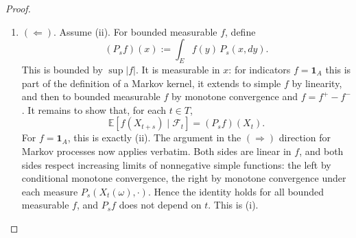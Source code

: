 \begin{proof}
\begin{enumerate}
			We claim that for every $t \in T$ and every Borel $C \subseteq \mathbb{R}$,
			\[
				\nu_{X_t}(C) = \mathbb{P}(\varphi(X_{t+s}) \in C \mid \mathcal{F}_t). \tag{$\ast$}
			\]
			For $C = (-\infty, q]$ with $q \in \mathbb{Q}$, this is Step 1, since $\nu_{X_t}(C) = G(X_t, q)$ on $\{X_t \notin N\}$, which has probability one. For $C = (-\infty, y]$ with $y$ real, take rationals $q_n \downarrow y$; both sides are continuous from above, the right-hand side by conditional dominated convergence. Thus $(\ast)$ holds on the $\pi$-system of half-lines. The class of $C$ satisfying $(\ast)$ is a $\lambda$-system, by linearity for proper differences and conditional monotone convergence for increasing unions. By the $\pi$--$\lambda$ theorem, $(\ast)$ holds for all Borel $C$.

			\textit{Step 4 (pulling back to $E$).} Applying $(\ast)$ with $C = B$ gives $\nu_{X_t}(B) = 1$ almost surely for every $t$. Hence $N' := N \cup \{x : \nu_x(B) < 1\} \in \mathcal{E}$ satisfies $\mu_t(N') = 0$ for all $t \in T$. Define
			\[
				P_s(x, A) := \begin{cases} \nu_x(\varphi(A)) & x \notin N', \\ \delta_{x_0}(A) & x \in N', \end{cases} \qquad A \in \mathcal{E}.
			\]
			Here $\varphi(A)$ is Borel because $\varphi$ is a Borel isomorphism. For $x \notin N'$, $P_s(x, \cdot)$ is the pushforward of $\nu_x|_B$ under $\varphi^{-1}$, hence a probability measure, and $x \mapsto P_s(x, A)$ is measurable by Step 3. So $P_s$ is a Markov kernel. Finally, by $(\ast)$ with $C = \varphi(A)$, for every $t \in T$,
			\[
				P_s(X_t, A) = \nu_{X_t}(\varphi(A)) = \mathbb{P}(\varphi(X_{t+s}) \in \varphi(A) \mid \mathcal{F}_t) = \mathbb{P}(X_{t+s} \in A \mid \mathcal{F}_t),
			\]
			where the first equality uses $\mu_t(N') = 0$. Since $s \in T$ was arbitrary, this is (ii).
		  \item $(\Leftarrow)$. Assume (ii). For bounded measurable $f$, define
			\[
				(P_s f)(x) := \int_E f(y) \, P_s(x, dy).
			\]
			This is bounded by $\sup |f|$. It is measurable in $x$: for indicators $f = \mathbf{1}_A$ this is part of the definition of a Markov kernel, it extends to simple $f$ by linearity, and then to bounded measurable $f$ by monotone convergence and $f = f^+ - f^-$. It remains to show that, for each $t \in T$,
			\[
				\mathbb{E}[f(X_{t+s}) \mid \mathcal{F}_t] = (P_s f)(X_t).
			\]
			For $f = \mathbf{1}_A$, this is exactly (ii). The argument in the $(\Rightarrow)$ direction for Markov processes now applies verbatim. Both sides are linear in $f$, and both sides respect increasing limits of nonnegative simple functions: the left by conditional monotone convergence, the right by monotone convergence under each measure $P_s(X_t(\omega), \cdot)$. Hence the identity holds for all bounded measurable $f$, and $P_s f$ does not depend on $t$. This is (i).
		\end{enumerate}
	\end{proof}

